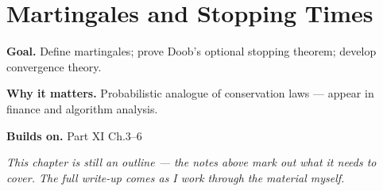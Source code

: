 \chapter{Martingales and Stopping Times}
\label{ch:11-probability-theory-07}

\begin{chapterintro}
\textbf{Goal.} Define martingales; prove Doob's optional stopping theorem; develop convergence theory.

\textbf{Why it matters.} Probabilistic analogue of conservation laws — appear in finance and algorithm analysis.

\textbf{Builds on.} Part XI Ch.3–6
\end{chapterintro}

\textit{This chapter is still an outline --- the notes above mark out what it needs to cover. The full write-up comes as I work through the material myself.}
